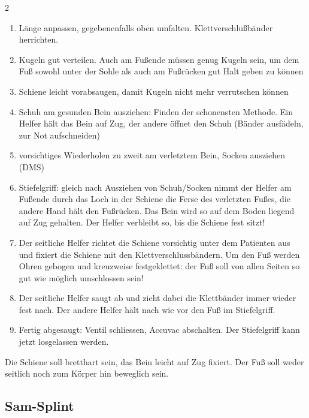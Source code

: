\begin{multicols}{2}
\begin{enumerate}
    \item Länge anpassen, gegebenenfalls oben umfalten.
    Klettverschlußbänder herrichten.
    \item Kugeln gut verteilen. Auch am Fußende müssen genug Kugeln
    sein, um dem Fuß sowohl unter der Sohle als auch am Fußrücken
    gut Halt geben zu können
    \item Schiene leicht vorabsaugen, damit Kugeln nicht mehr verrutschen
    können
    \item Schuh am gesunden Bein ausziehen: Finden der schonensten Methode.
    Ein Helfer hält das Bein auf Zug, der andere öffnet den Schuh
    (Bänder ausfädeln, zur Not aufschneiden)
    \item vorsichtiges Wiederholen zu zweit am verletztem Bein, Socken
    ausziehen (DMS)
    \item Stiefelgriff: gleich nach Ausziehen von Schuh/Socken nimmt der
    Helfer am Fußende durch das Loch in der Schiene die Ferse des
    verletzten Fußes, die andere Hand hält den Fußrücken. Das
    Bein wird so auf dem Boden liegend auf Zug gehalten. Der Helfer
    verbleibt so, bis die Schiene fest sitzt!
    \item Der seitliche Helfer richtet die Schiene vorsichtig unter dem
    Patienten aus und fixiert die Schiene mit den Klettverschlussbändern.
    Um den Fuß werden Ohren gebogen und kreuzweise festgeklettet: der
    Fuß soll von allen Seiten so gut wie möglich umschlossen sein!
    \item Der seitliche Helfer saugt ab und zieht dabei die Klettbänder
    immer wieder fest nach. Der andere Helfer hält nach wie vor den
    Fuß im Stiefelgriff.
    \item Fertig abgesaugt: Ventil schliessen, Accuvac abschalten. Der
    Stiefelgriff kann jetzt losgelassen werden.
\end{enumerate}
\end{multicols}

Die Schiene soll bretthart sein, das Bein leicht auf Zug fixiert. Der
Fuß soll weder seitlich noch zum Körper hin beweglich sein.



\subsection{Sam-Splint}
\label{topic:sam-splint-anwendung}


